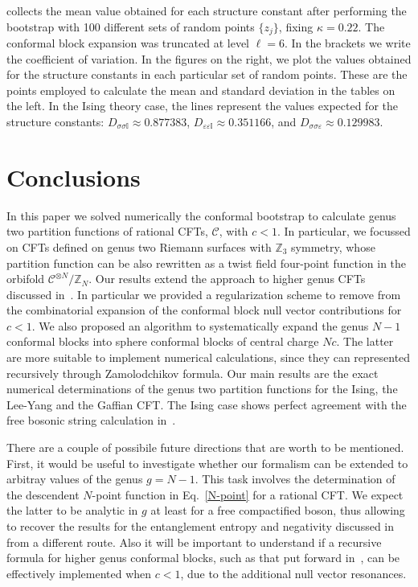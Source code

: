 \documentclass[a4paper,11pt]{article}
\begin{document}
\begin{table}[tbp]
{collects the mean value obtained for each structure constant after performing the bootstrap
with 100 different sets of random points $\{z_j\}$, fixing $\kappa=0.22$. The conformal block
expansion was truncated at level $\ell=6$. In the brackets we write the coefficient of variation.
In the figures on the right, we plot the values obtained for the structure constants
in each particular set of random points. These are the points employed to calculate the mean and 
standard deviation in the tables on the left. In the Ising theory case, the lines represent the values expected
for the structure constants: $D_{\sigma\sigma\mathbb{I}}\approx 0.877383$, 
$D_{\varepsilon\varepsilon\mathbb{I}}\approx 0.351166$, and $D_{\sigma\sigma\varepsilon}\approx 0.129983$. }
\end{table}


\section{Conclusions}
In this paper we solved numerically the conformal bootstrap to calculate genus two partition functions of rational CFTs, $\mathcal{C}$, with $c<1$. In particular, we focussed on CFTs defined on genus two Riemann surfaces with $\mathbb Z_3$ symmetry, whose partition function can be also rewritten as a twist field four-point function in the orbifold $\mathcal{C}^{\otimes N}/\mathbb Z_N$. Our results extend the approach to higher genus CFTs discussed in~\cite{Cardy, Collier}. In particular we provided a regularization scheme to remove from the combinatorial expansion of the conformal block null vector contributions for $c<1$. We also proposed an algorithm to systematically expand the genus $N-1$ conformal blocks into sphere conformal blocks of central charge $Nc$. The latter are more suitable to implement numerical calculations, since they can represented recursively through Zamolodchikov formula.
Our main results are the exact numerical determinations of the genus two partition functions for the Ising, the Lee-Yang and the Gaffian CFT. The Ising case shows perfect agreement with the free bosonic string calculation in~\cite{Calabrese}.

There are a couple of possibile future directions that are worth to be mentioned. First, it would be useful to investigate whether our formalism can be extended to arbitray values of the genus $g=N-1$. This task involves the determination of the descendent $N$-point function in Eq.~\eqref{N-point} for a rational CFT.  We expect the latter to be analytic in $g$  at least for a free compactified boson, thus allowing to recover the results for the entanglement entropy and negativity discussed in~\cite{Calabrese, Furukawa, Calabrese09, CalabreseNeg, Grava} from a different route.
Also it will be important to understand if a recursive formula for higher genus conformal blocks, such as that put forward in~\cite{Cho}, can be effectively implemented when $c<1$, due to the additional null vector resonances.
\end{document}

